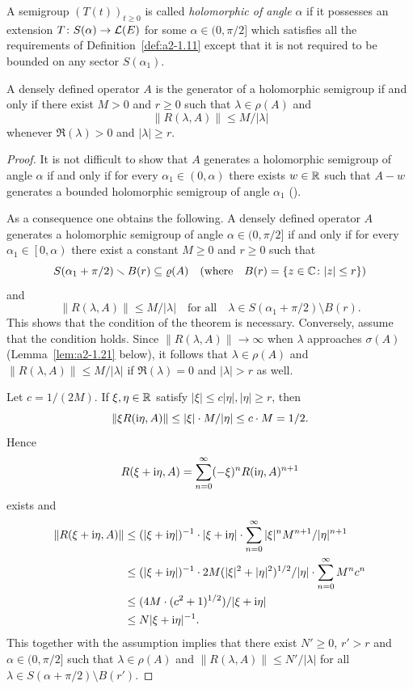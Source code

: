 A semigroup $(T(t))_{t \geq 0}$ is called \emph{holomorphic of angle} $\alpha$ if it possesses an extension $T \colon S(\alpha) \to \mathcal{L}(E)$ for some $\alpha \in (0,\pi/2]$ which satisfies all the requirements of Definition~\ref{def:a2-1.11} except that it is not required to be bounded on any sector $S(\alpha_{1})$.
\begin{theorem}\label{thm:a2-1.14}
A densely defined operator $A$ is the generator of a holomorphic semigroup if and only if there exist $M > 0$ and $r \geq 0$ such that $\lambda \in \rho(A)$ and 
%
\[
	\|R(\lambda,A)\| \leq M/|\lambda| 
\]
%
whenever $\Re(\lambda) > 0$ and $|\lambda| \geq r$.
\end{theorem}
\begin{proof}
It is not difficult to show that $A$ generates a holomorphic semigroup of angle $\alpha$ if and only if for every $\alpha_{1} \in (0,\alpha)$ there exists $w \in \mathbb{R}$ such that $A - w$ generates a bounded holomorphic semigroup of angle $\alpha_{1}$ (\cf \textcite[p.252]{reedsimon:1978}).

As a consequence one obtains the following.
A densely defined operator $A$ generates a holomorphic semigroup of angle $\alpha \in (0,\pi/2]$ if and only if for every $\alpha_{1} \in \left[0,\alpha\right)$ there exist a constant $M \geq 0$ and $r \geq 0$ such that 
\[
S(\alpha_{1} + \pi/2) \setminus B(r) \subseteq \rho(A) \quad (\text{where} \quad B(r) = \{z \in \C \colon |z| \leq r\})
\]
and
\[
\|R(\lambda,A)\| \leq M/|\lambda|  \quad \text{for all}  \quad \lambda \in S(\alpha_{1}+\pi/2) \setminus B(r).
\]
This shows that the condition of the theorem is necessary.
Conversely, assume that the condition holds.
Since $\|R(\lambda,A)\| \to \infty$ when $\lambda$ approaches $\sigma(A)$ (\cf Lemma~\ref{lem:a2-1.21}   below), 
it follows that $\lambda \in \rho(A)$ and $\|R(\lambda,A)\| \leq M/|\lambda|$ if\/ $\Re(\lambda) = 0$ and $|\lambda| > r$ as well.

Let $c = 1/(2M)$.
If\/ $\xi, \eta \in \mathbb{R}$ satisfy $|\xi| \leq c|\eta|, |\eta| \geq r$, 
then 
\[
\|\xi R(\im\eta,A)\| \leq |\xi| \cdot M/|\eta| \leq c \cdot M = 1/2.
\]
Hence 
%
\[
	R(\xi+\mathrm{i}\eta,A) = \sum_{n=0}^\infty (-\xi)^{n}R(\mathrm{i}\eta,A)^{n+1} 
\]
%
exists and 
\begin{align*}
    \|R(\xi+\im\eta,A)\| &\leq 
    (|\xi + \im\eta|)^{-1} \cdot |\xi + \im\eta| \cdot \sum_{n=0}^\infty |\xi|^{n}M^{n+1}/|\eta|^{n+1}\\
    &\leq  (|\xi + \im\eta|)^{-1} \cdot 2M (|\xi|^{2} + |\eta|^{2})^{1/2} / |\eta| \cdot \sum_{n=0}^\infty M^{n}c^{n}\\   
    &\leq  (4M\cdot(c^{2}+1)^{1/2})/|\xi+\im\eta| \\
    &\leq N |\xi+\im\eta|^{-1}  . 
\end{align*}
This together with the assumption implies that there exist $N' \geq 0$, $r' > r$ and $\alpha \in (0,\pi/2]$ such that $\lambda \in \rho(A)$ and $\|R(\lambda,A)\| \leq N'/|\lambda|$ for all $\lambda \in S(\alpha+\pi/2) \setminus B(r')$.
\end{proof}

